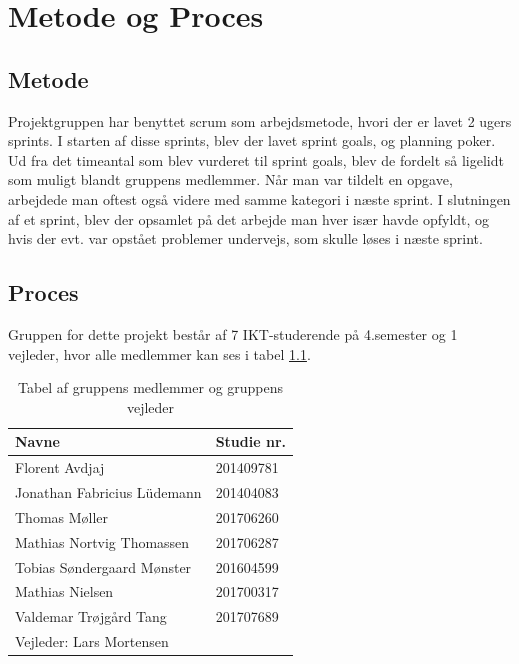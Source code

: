 \chapter{Metode og Proces}
\section{Metode}

Projektgruppen har benyttet scrum som arbejdsmetode, hvori der er lavet 2 ugers sprints. I starten af disse sprints, blev der lavet sprint goals, og planning poker. Ud fra det timeantal som blev vurderet til sprint goals, blev de fordelt så ligelidt som muligt blandt gruppens medlemmer. Når man var tildelt en opgave, arbejdede man oftest også videre med samme kategori i næste sprint. \newline
I slutningen af et sprint, blev der opsamlet på det arbejde man hver især havde opfyldt, og hvis der evt. var opstået problemer undervejs, som skulle løses i næste sprint.


\section{Proces} 
 Gruppen for dette projekt består af 7 IKT-studerende på 4.semester og 1 vejleder, hvor alle medlemmer kan ses i tabel \ref{tab:grpMedlem}.


\begin{table}[H]
    \centering
    \begin{tabular}{|p{2.2in}|p{1in}|} \hline 
        \textbf{Navne} & \textbf{Studie nr.} \\ \hline 
        Florent Avdjaj & 201409781 \\ \hline 
        Jonathan Fabricius L\"{u}demann & 201404083 \\ \hline 
        Thomas M{\o}ller & 201706260 \\ \hline 
        Mathias Nortvig Thomassen & 201706287 \\ \hline 
        Tobias S{\o}ndergaard M{\o}nster & 201604599 \\ \hline 
        Mathias Nielsen & 201700317 \\ \hline 
        Valdemar Tr{\o}jg{\aa}rd Tang & 201707689 \\ \hline 
        \multicolumn{2}{|l|}{Vejleder:                                                              Lars Mortensen} \\ \hline 
    \end{tabular}
    \caption{Tabel af gruppens medlemmer og gruppens vejleder}
    \label{tab:grpMedlem}
\end{table}

